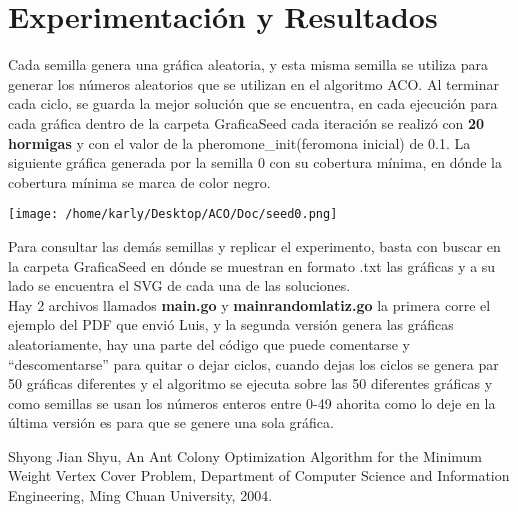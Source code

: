 \documentclass[a4paper, 11pt, spanish, oneside]{book}
\begin{document}
\chapter*{Experimentación y Resultados}
Cada semilla genera una gráfica aleatoria, y esta misma semilla se utiliza para generar los números aleatorios que se utilizan en el algoritmo ACO. Al terminar cada ciclo, se guarda la mejor solución que se encuentra, en cada ejecución para cada gráfica dentro de la carpeta GraficaSeed cada iteración se realizó con \textbf{20 hormigas} y con el valor de la pheromone\_init(feromona inicial) de 0.1. La siguiente gráfica generada por la semilla 0 con su cobertura mínima, en dónde la cobertura mínima se marca de color negro.\\

\begin{center}
 \texttt{[image: /home/karly/Desktop/ACO/Doc/seed0.png]}
\end{center}

Para consultar las demás semillas y replicar el experimento, basta con buscar en la carpeta GraficaSeed en dónde se muestran en formato .txt las gráficas y a su lado se encuentra el SVG de cada una de las soluciones.\\
Hay 2 archivos llamados \textbf{main.go} y \textbf{mainrandomlatiz.go} la primera corre el ejemplo del PDF que envió Luis, y la segunda versión genera las gráficas aleatoriamente, hay una parte del código que puede comentarse y ``descomentarse'' para quitar o dejar ciclos, cuando dejas los ciclos se genera par 50 gráficas diferentes y el algoritmo se ejecuta sobre las 50 diferentes gráficas y como semillas se usan los números enteros entre 0-49
ahorita como lo deje en la última versión es para que se genere una sola gráfica.

\begin{thebibliography}{Bibliografía}
 Shyong Jian Shyu, An Ant Colony Optimization Algorithm for the Minimum Weight Vertex
Cover Problem, Department of Computer Science and Information Engineering, Ming Chuan
University, 2004.
\end{thebibliography}
\end{document}
